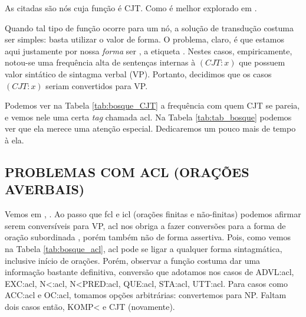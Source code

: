 As  citadas são nós cuja função é CJT. Como é melhor explorado em \cite[p~96]{afonso2006arvores} .

Quando tal tipo de função ocorre para um nó, a solução de transdução costuma ser simples: basta utilizar o valor de forma. O problema, claro, é que estamos aqui justamente por nossa \textit{forma} ser , a etiqueta . Nestes casos, empiricamente, notou-se uma frequência alta de sentenças internas à $(CJT:x)$ que possuem valor sintático de sintagma verbal (VP). Portanto, decidimos que os casos $(CJT:x)$ seriam convertidos para VP.
\begin{center}
    
\end{center}

Podemos ver na Tabela \ref{tab:bosque_CJT} a frequência com quem CJT se pareia, e vemos nele uma certa \textit{tag} chamada acl. Na Tabela \ref{tab:tab_bosque} podemos ver que ela merece uma atenção especial. Dedicaremos um pouco mais de tempo à ela.
\subsection{PROBLEMAS COM ACL (ORAÇÕES AVERBAIS)}
\label{subsec:tag_acl}
Vemos em \cite{freitas2007biblia}, . Ao passo que fcl e icl (orações finitas e não-finitas) podemos afirmar serem conversíveis para VP, acl nos obriga a fazer conversões para a forma de oração subordinada \cite[p~172]{bracketing_ptb}, porém também não de forma assertiva. Pois, como vemos na Tabela \ref{tab:bosque_acl}, acl pode se ligar a qualquer forma sintagmática, inclusive início de orações. Porém, observar a função costuma dar uma informação bastante definitiva, conversão que adotamos nos casos de ADVL:acl, EXC:acl, N<:acl, N<PRED:acl, QUE:acl, STA:acl, UTT:acl. Para casos como ACC:acl e OC:acl, tomamos opções arbitrárias: convertemos para NP. Faltam dois casos então, KOMP< e CJT (novamente).
\begin{center}
    
\end{center}
